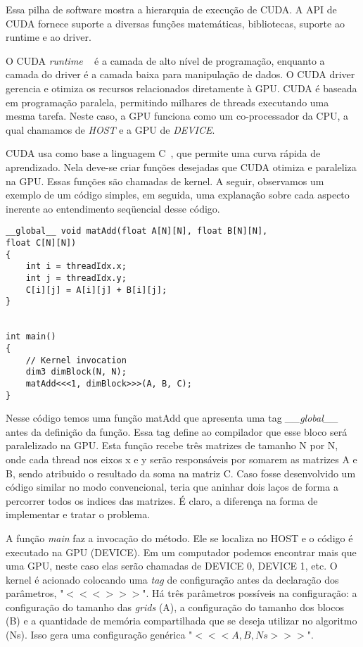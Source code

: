 Essa pilha de software mostra a hierarquia de execução de CUDA. A API de CUDA fornece suporte a diversas funções matemáticas, bibliotecas, suporte ao runtime e ao driver.

O CUDA \textit{runtime} ~\citep{cuda} é a camada de alto nível de programação, enquanto a camada do driver é a camada baixa para manipulação de dados. O CUDA driver gerencia e otimiza os recursos relacionados diretamente à GPU. CUDA é baseada em programação paralela, permitindo milhares de threads executando uma mesma tarefa. Neste caso, a GPU funciona como um co-processador da CPU, a qual chamamos de \textit{HOST} e a GPU de \textit{DEVICE}.

CUDA usa como base a linguagem C~\citep{cuda}, que permite uma curva rápida de aprendizado. Nela deve-se criar funções desejadas que CUDA otimiza e paraleliza na GPU. Essas funções são chamadas de kernel. A seguir, observamos um exemplo de um código simples, em seguida, uma explanação sobre cada aspecto inerente ao entendimento seqüencial desse código.


\begin{verbatim}
__global__ void matAdd(float A[N][N], float B[N][N],
float C[N][N])
{
    int i = threadIdx.x;
    int j = threadIdx.y;
    C[i][j] = A[i][j] + B[i][j];
}


int main()
{
    // Kernel invocation
    dim3 dimBlock(N, N);
    matAdd<<<1, dimBlock>>>(A, B, C);
}

\end{verbatim}

Nesse código temos uma função matAdd que apresenta uma tag \textit{\_\_global\_\_} antes da definição da função. Essa tag define ao compilador que esse bloco será paralelizado na GPU.  Esta função recebe três matrizes de tamanho N por N, onde cada thread nos eixos x e y serão responsáveis por somarem as matrizes A e B, sendo atribuido o resultado da soma na matriz C.  Caso fosse desenvolvido um código similar no modo convencional, teria que aninhar dois laços de forma a percorrer todos os indices das matrizes. É claro, a diferença na forma de implementar e tratar o problema.

A função \textit{main} faz a invocação do método. Ele se localiza no HOST e o código é executado na GPU (DEVICE). Em um computador podemos encontrar mais que uma GPU, neste caso elas serão chamadas de DEVICE 0, DEVICE 1, etc. O kernel é acionado colocando uma \textit{tag} de configuração antes da declaração dos parâmetros, "$<<< >>>$". Há três parâmetros possíveis na configuração: a configuração do tamanho das \textit{grids} (A), a configuração do tamanho dos blocos (B) e a quantidade de memória compartilhada que se deseja utilizar no algoritmo (Ns). Isso gera uma configuração genérica "$<<<A,B,Ns >>>$".


